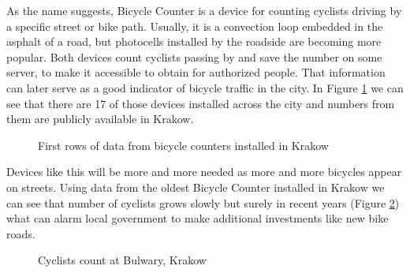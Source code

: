 As the name suggests, Bicycle Counter is a device for counting cyclists driving by a specific street or bike path. Usually, it is a convection loop embedded in the asphalt of a road, but photocells installed by the roadside are becoming more popular. Both devices count cyclists passing by and save the number on some server, to make it accessible to obtain for authorized people. That information can later serve as a good indicator of bicycle traffic in the city. In Figure \ref{fig:countersKrakow} we can see that there are 17 of those devices installed across the city and numbers from them are publicly available in Krakow.
\begin{figure}[H]
    \centering
    \caption{First rows of data from bicycle counters installed in Krakow \cite{liczniki}}
    \label{fig:countersKrakow}
\end{figure}
Devices like this will be more and more needed as more and more bicycles appear on streets. Using data from the oldest Bicycle Counter installed in Krakow  \cite{liczniki} we can see that number of cyclists grows slowly but surely in recent years (Figure \ref{fig:graph3}) what can alarm local government to make additional investments like new bike roads.
\begin{figure}[H]
    \centering
    \caption{Cyclists count at Bulwary, Krakow}
    \label{fig:graph3}
\end{figure}
